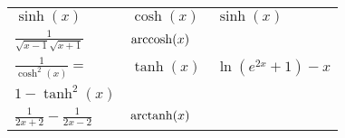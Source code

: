 \begin{tabular}{l | l | l}
    $\sinh(x)$                                                        & $\cosh(x)$              & $\sinh(x)$\\
    $\frac{1}{\sqrt{x-1}\sqrt{x+1}}$                                  & $\operatorname{arccosh}(x)$           & \\
    $\frac{1}{\cosh^2(x)} =$                                          & $\tanh(x)$              & $\ln(e^{2x} + 1) - x$\\
    $1 - \tanh^2(x)$                                                  &                         & \\
    $\frac{1}{2x+2} - \frac{1}{2x - 2}$                               & $\operatorname{arctanh}(x)$           & \\
\end{tabular}
